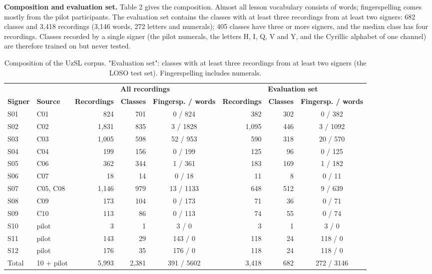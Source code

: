 \textbf{Composition and evaluation set.} Table 2 gives the composition. Almost all lesson vocabulary consists of words; fingerspelling comes mostly from the pilot participants. The evaluation set contains the classes with at least three recordings from at least two signers: 682 classes and 3,418 recordings (3,146 words, 272 letters and numerals); 405 classes have three or more signers, and the median class has four recordings. Classes recorded by a single signer (the pilot numerals, the letters H, I, Q, V and Y, and the Cyrillic alphabet of one channel) are therefore trained on but never tested.

\begin{table}[t]
\caption{Composition of the UzSL corpus. "Evaluation set": classes with at least three recordings from at least two signers (the LOSO test set). Fingerspelling includes numerals.}\label{tab:corpus}
\footnotesize\setlength{\tabcolsep}{4pt}
\centering
\begin{tabular}{llrrcrrc}
\toprule
& & \multicolumn{3}{c}{\textbf{All recordings}} & \multicolumn{3}{c}{\textbf{Evaluation set}} \\ \cmidrule(lr){3-5}\cmidrule(lr){6-8}
\textbf{Signer} & \textbf{Source} & \textbf{Recordings} & \textbf{Classes} & \textbf{Fingersp. / words} & \textbf{Recordings} & \textbf{Classes} & \textbf{Fingersp. / words} \\
\midrule
S01 & C01 & 824 & 701 & 0 / 824 & 382 & 302 & 0 / 382 \\
S02 & C02 & 1,831 & 835 & 3 / 1828 & 1,095 & 446 & 3 / 1092 \\
S03 & C03 & 1,005 & 598 & 52 / 953 & 590 & 318 & 20 / 570 \\
S04 & C04 & 199 & 156 & 0 / 199 & 125 & 96 & 0 / 125 \\
S05 & C06 & 362 & 344 & 1 / 361 & 183 & 169 & 1 / 182 \\
S06 & C07 & 18 & 14 & 0 / 18 & 11 & 8 & 0 / 11 \\
S07 & C05, C08 & 1,146 & 979 & 13 / 1133 & 648 & 512 & 9 / 639 \\
S08 & C09 & 173 & 104 & 0 / 173 & 71 & 36 & 0 / 71 \\
S09 & C10 & 113 & 86 & 0 / 113 & 74 & 55 & 0 / 74 \\
S10 & pilot & 3 & 1 & 3 / 0 & 3 & 1 & 3 / 0 \\
S11 & pilot & 143 & 29 & 143 / 0 & 118 & 24 & 118 / 0 \\
S12 & pilot & 176 & 35 & 176 / 0 & 118 & 24 & 118 / 0 \\
Total & 10 + pilot & 5,993 & 2,381 & 391 / 5602 & 3,418 & 682 & 272 / 3146 \\
\bottomrule
\end{tabular}
\end{table}

